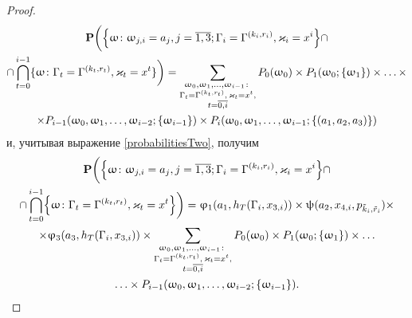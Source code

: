 \begin{proof}
\begin{multline*}
\Pr\biggl( \Bigl\{ \omega \colon \omega_{j,  i} = a_j, j=\overline{1,  3}; \Gamma_i=\Gamma^{(k_i,  r_i)},   \varkappa_i=x^i\Bigr\} \cap \\ \cap \bigcap_{t=0}^{i-1}\{\omega\colon \Gamma_t=\Gamma^{(k_t,  r_t)},   \varkappa_t=x^t\}\biggr) 
= \sum_{\substack{\omega_0,   \omega_1,  \ldots,   \omega_{i-1} \colon \\ \Gamma_t=\Gamma^{(k_t,  r_t)},  \,   \varkappa_t=x^t,   \\ t=\overline{0,  i}}} P_0(\omega_0)\times P_1(\omega_0;\{\omega_1\})\times\ldots \times \\ \times P_{i-1}(\omega_0,  \omega_1,  \ldots,   \omega_{i-2};\{\omega_{i-1}\})
\times P_i(\omega_0,  \omega_1,  \ldots,   \omega_{i-1};\{(a_1,   a_2,   a_3)\})
\end{multline*}
и,   учитывая выражение \eqref{probabilitiesTwo},   получим
\begin{multline}
\Pr\biggl( \Bigl\{ \omega \colon \omega_{j,  i} = a_j,   j=\overline{1,  3}; \Gamma_i=\Gamma^{(k_i,  r_i)},   \varkappa_i=x^i\Bigr\} \cap \\ \cap \bigcap_{t=0}^{i-1}\Bigl\{\omega\colon \Gamma_t=\Gamma^{(k_t,  r_t)},   \varkappa_t=x^t\Bigr\}\biggr) 
=\varphi_1(a_1,  h_T(\Gamma_i,  x_{3,  i})) \times \psi(a_2,  x_{4,  i},   p_{\tilde{k}_i,  \tilde{r}_i}) \times \\ \times  \varphi_3(a_3,  h_T(\Gamma_i,  x_{3,  i}))
\times  \sum_{\substack{\omega_0,   \omega_1,  \ldots,   \omega_{i-1} \colon \\ \Gamma_t=\Gamma^{(k_t,  r_t)},  \,   \varkappa_t=x^t,  \\ t=\overline{0,  i}}} P_0(\omega_0)\times P_1(\omega_0;\{\omega_1\})\times \ldots \\ \ldots \times P_{i-1}(\omega_0,  \omega_1,  \ldots,   \omega_{i-2};\{\omega_{i-1}\}).
\label{Construction:4}
\end{multline}


\end{proof}
